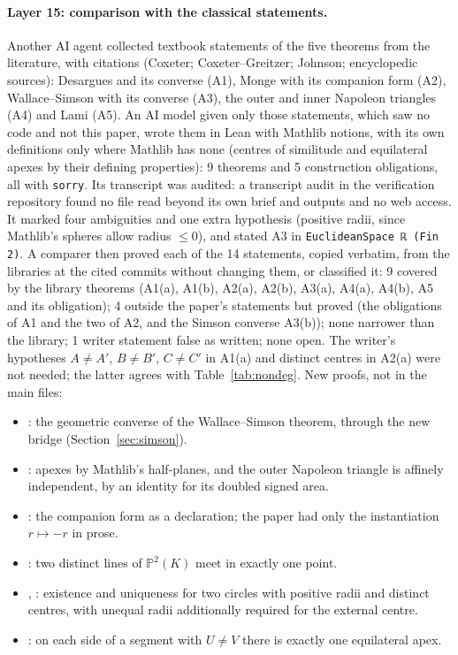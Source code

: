 \documentclass[11pt]{article}
\theoremstyle{definition}
\theoremstyle{remark}
\newcommand{\lean}[1]{\texttt{#1}}
\newcommand{\PP}{\mathbb{P}}
\begin{document}
\paragraph{Layer 15: comparison with the classical statements.} Another AI agent collected
textbook statements of the five theorems from the literature, with citations (Coxeter;
Coxeter--Greitzer; Johnson; encyclopedic sources): Desargues and its converse (A1), Monge with its
companion form (A2), Wallace--Simson with its converse (A3), the outer and inner Napoleon
triangles (A4) and Lami (A5). An AI model given only those statements, which saw no code and not
this paper, wrote them in Lean with Mathlib notions, with its own definitions only where Mathlib has
none (centres of similitude and equilateral apexes by their defining properties): 9 theorems and 5
construction obligations, all with \lean{sorry}. Its transcript was audited: a transcript audit in the verification repository found no file read
beyond its own brief and outputs and no web access. It marked four
ambiguities and one extra hypothesis (positive radii, since Mathlib's spheres allow radius
$\le0$), and stated A3 in \lean{EuclideanSpace ℝ (Fin 2)}. A comparer then proved each of the 14
statements, copied verbatim, from the libraries at the cited commits without changing them, or
classified it: 9 covered by the library theorems (A1(a), A1(b), A2(a), A2(b), A3(a), A4(a), A4(b),
A5 and its obligation); 4 outside the paper's statements but proved (the obligations of A1 and the
two of A2, and the Simson converse A3(b)); none narrower than the library; 1 writer statement false
as written; none open. The writer's hypotheses $A\ne A'$, $B\ne B'$, $C\ne C'$ in A1(a) and distinct centres in A2(a)
were not needed; the latter agrees with Table~\ref{tab:nondeg}. New proofs, not in the main files:
\begin{itemize}
\item {}: the geometric converse of the Wallace--Simson theorem, through
the new bridge  (Section~\ref{sec:simson}).
\item {}: apexes by Mathlib's half-planes, and the outer Napoleon
triangle is affinely independent, by an identity for its doubled signed area.
\item {}: the companion form as a declaration; the paper had only the
instantiation $r\mapsto-r$ in prose.
\item {}: two distinct lines of $\PP^2(K)$ meet in exactly
one point.
\item {}, :
existence and uniqueness for two circles with positive radii and distinct centres, with unequal
radii additionally required for the external centre.
\item {}: on each side of a segment with $U\ne V$
there is exactly one equilateral apex.
\end{itemize}
\end{document}
